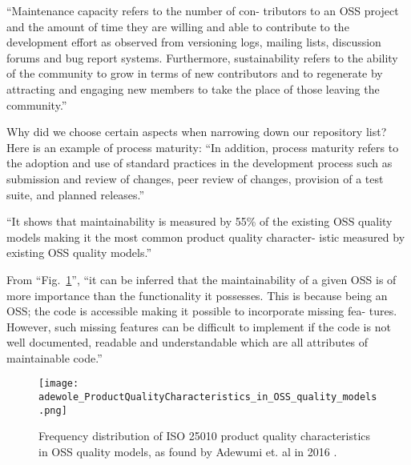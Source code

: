 \documentclass[12pt,letterpaper]{report}
\begin{document}


``Maintenance capacity refers to the number of con- tributors to an OSS project and the amount of time they are willing and able to contribute to the development effort as observed from versioning logs, mailing lists, discussion forums and bug report systems. Furthermore, sustainability refers to the ability of the community to grow in terms of new contributors and to regenerate by attracting and engaging new members to take the place of those leaving the community.'' \cite{adewumi:2016}

Why did we choose certain aspects when narrowing down our repository list? Here is an example of process maturity: ``In addition, process maturity refers to the adoption and use of standard practices in the development process such as submission and review of changes, peer review of changes, provision of a test suite, and planned releases.'' \cite{adewumi:2016}

``It shows that maintainability is measured by 55\% of the existing OSS quality models making it the most common product quality character- istic measured by existing OSS quality models.'' \cite{adewumi:2016}

From ``Fig.~\ref{figFreqDistProductQualityModel}'', ``it can be inferred that the maintainability of a given OSS is of more importance than the functionality it possesses. This is because being an OSS; the code is accessible making it possible to incorporate missing fea- tures. However, such missing features can be difficult to implement if the code is not well documented, readable and understandable which are all attributes of maintainable code.'' \cite{adewumi:2016}

\begin{figure}[ht]
  \centerline{
      \texttt{[image: adewole\_ProductQualityCharacteristics\_in\_OSS\_quality\_models.png]}
  }
  \caption{Frequency distribution of ISO 25010 product quality characteristics in OSS quality models, as found by Adewumi et. al in 2016 \cite{adewumi:2016}.}
  \label{figFreqDistProductQualityModel}
\end{figure}
\end{document}
